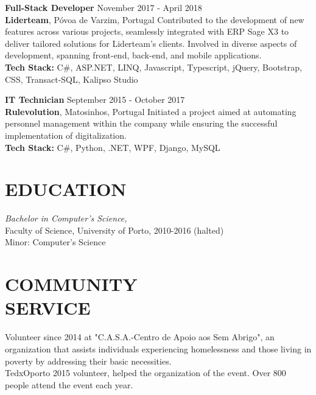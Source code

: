 \documentclass[margin, 10pt]{res} %
\begin{document}
\begin{resume}
    
    \textbf{Full-Stack Developer} \hfill November 2017 - April 2018\\
    \textbf{Liderteam}, Póvoa de Varzim, Portugal
    Contributed to the development of new features across various projects, seamlessly integrated with ERP Sage X3 to deliver tailored solutions for Liderteam's clients. Involved in diverse aspects of development, spanning front-end, back-end, and mobile applications.\\
    \textbf {Tech Stack:} C\#, ASP.NET, LINQ, Javascript, Typescript, jQuery, Bootstrap, CSS, Transact-SQL, Kalipso Studio

    
    \textbf{IT Technician} \hfill September 2015 - October 2017\\
    \textbf{Rulevolution}, Matosinhos, Portugal
    Initiated a project aimed at automating personnel management within the company while ensuring the successful implementation of digitalization.\\
    \textbf {Tech Stack:} C\#, Python, .NET, WPF, Django, MySQL



    \section{EDUCATION}

     {\sl Bachelor in Computer's Science,} \\
    Faculty of Science, University of Porto, 2010-2016 (halted)  \\
    Minor: Computer's Science


    \section{COMMUNITY \\ SERVICE}

    Volunteer since 2014 at "C.A.S.A.-Centro de Apoio aos Sem Abrigo", an organization that assists individuals experiencing homelessness and those living in poverty by addressing their basic necessities.\\
    TedxOporto 2015 volunteer, helped the organization of the event. Over 800 people attend the event each year.


\end{resume}
\end{document}
